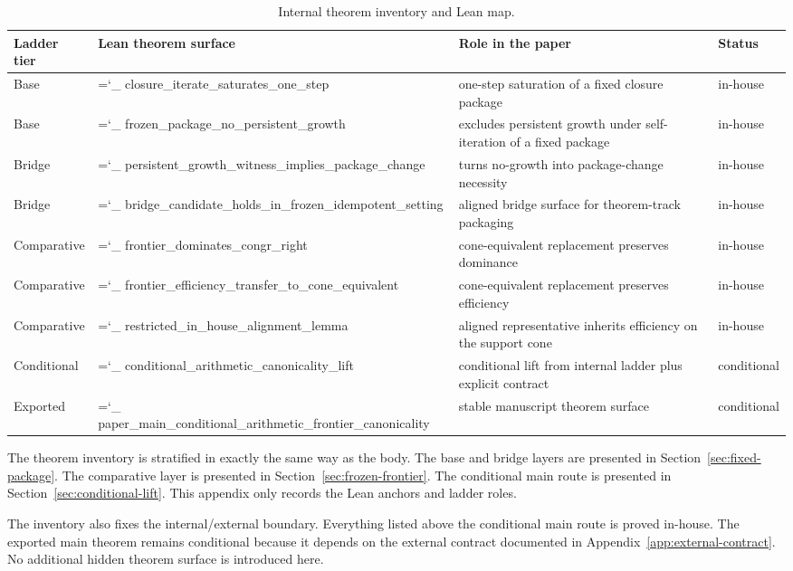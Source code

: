 \documentclass[11pt]{article}
\newcommand{\lid}[1]{{\small\ttfamily\hyphenchar\font=`\_ #1}}
\begin{document}
\begin{table}[h]
\caption{Internal theorem inventory and Lean map.}
\label{tab:theorem-inventory}
\centering
\small
\begin{tabularx}{\textwidth}{@{}l X X l@{}}
\toprule
Ladder tier & Lean theorem surface & Role in the paper & Status \\
\midrule
Base & \lid{closure\_iterate\_saturates\_one\_step} & one-step saturation of a fixed closure package & in-house \\[4pt]
Base & \lid{frozen\_package\_no\_persistent\_growth} & excludes persistent growth under self-iteration of a fixed package & in-house \\[4pt]
Bridge & \lid{persistent\_growth\_witness\_implies\_package\_change} & turns no-growth into package-change necessity & in-house \\[4pt]
Bridge & \lid{bridge\_candidate\_holds\_in\_frozen\_idempotent\_setting} & aligned bridge surface for theorem-track packaging & in-house \\[4pt]
Comparative & \lid{frontier\_dominates\_congr\_right} & cone-equivalent replacement preserves dominance & in-house \\[4pt]
Comparative & \lid{frontier\_efficiency\_transfer\_to\_cone\_equivalent} & cone-equivalent replacement preserves efficiency & in-house \\[4pt]
Comparative & \lid{restricted\_in\_house\_alignment\_lemma} & aligned representative inherits efficiency on the support cone & in-house \\[4pt]
Conditional & \lid{conditional\_arithmetic\_canonicality\_lift} & conditional lift from internal ladder plus explicit contract & conditional \\[4pt]
Exported & \lid{paper\_main\_conditional\_arithmetic\_frontier\_canonicality} & stable manuscript theorem surface & conditional \\
\bottomrule
\end{tabularx}
\end{table}

The theorem inventory is stratified in exactly the same way as the body. The base and bridge layers are presented in Section~\ref{sec:fixed-package}. The comparative layer is presented in Section~\ref{sec:frozen-frontier}. The conditional main route is presented in Section~\ref{sec:conditional-lift}. This appendix only records the Lean anchors and ladder roles.

The inventory also fixes the internal/external boundary. Everything listed above the conditional main route is proved in-house. The exported main theorem remains conditional because it depends on the external contract documented in Appendix~\ref{app:external-contract}. No additional hidden theorem surface is introduced here.
\end{document}
